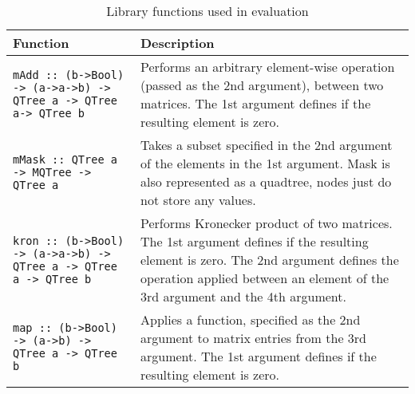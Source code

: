 \begin{table}[t!]
\footnotesize
\centering
\begin{tabular}{ |l|l|} 
\hline
\rowcolor{LightBlue}
{Function} & {Description}\\
\hline
\multirow{5}{0.6\textwidth}{\texttt{mAdd :: (b->Bool) -> (a->a->b) -> QTree a -> QTree a-> QTree b}} & \multirow{5}{0.35\textwidth}{Performs an arbitrary element-wise operation (passed as the 2nd argument),
between two matrices. The 1st argument defines if the resulting element is zero.
}\\
{} & {}\\
{} & {}\\
{} & {}\\
{} & {}\\
\hline
\multirow{5}{0.6\linewidth}{\texttt{mMask :: QTree a -> MQTree -> QTree a}} & \multirow{5}{0.35\linewidth}{Takes a subset specified in the 2nd argument of the elements in the 1st argument. Mask is also represented as a quadtree, nodes just do not store any values.
}\\
{} & {}\\
{} & {}\\
{} & {}\\
{} & {}\\
\hline
\multirow{6}{0.6\linewidth}{\texttt{kron :: (b->Bool) -> (a->a->b) -> QTree a -> QTree a -> QTree b}} & \multirow{6}{0.35\linewidth}{Performs Kronecker product of two matrices. The 1st argument defines if the resulting element is zero. The 2nd argument defines the operation applied between an element of the 3rd argument and the 4th argument. 
}\\
{} & {}\\
{} & {}\\
{} & {}\\
{} & {}\\
{} & {}\\
\hline
\multirow{5}{0.6\linewidth}{\texttt{map :: (b->Bool) -> (a->b) -> QTree a -> QTree b}} & \multirow{5}{0.35\linewidth}{Applies a function, specified as the 2nd argument to matrix entries from the 3rd argument. The 1st argument defines if the resulting element is zero.
}\\
{} & {}\\
{} & {}\\
{} & {}\\
{} & {}\\
\hline
\end{tabular}
    \caption{Library functions used in evaluation}
    \label{tab:sparse_linalg}
\end{table}

